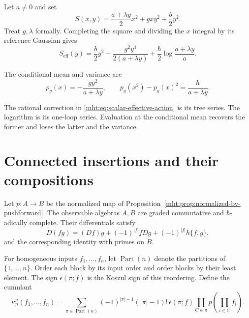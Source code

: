 \begin{example}\label{mht:ex:scalar-effective-action}
Let $a\ne0$ and set
\[
 S(x,y)=\frac{a+\lambda y}{2}x^2+gxy^2+\frac b2y^2.
\]
Treat $g,\lambda$ formally. Completing the square and dividing the
$x$ integral by its reference Gaussian gives
\begin{equation}\label{mht:eq:scalar-effective-action}
 S_{\mathrm{eff}}(y)=\frac b2y^2
       -\frac{g^2y^4}{2(a+\lambda y)}
       +\frac\hbar2\log\frac{a+\lambda y}{a}.
\end{equation}

The conditional mean and variance are
\[
 p_y(x)=-\frac{gy^2}{a+\lambda y},\qquad
 p_y(x^2)-p_y(x)^2=\frac\hbar{a+\lambda y}.
\]

The rational correction in \eqref{mht:eq:scalar-effective-action}
is its tree series. The logarithm is its one-loop series. Evaluation
at the conditional mean recovers the former and loses the latter
and the variance.
\end{example}

\section{Connected insertions and their compositions}

Let $p:A\to B$ be the normalized map of
Proposition~\ref{mht:prop:normalized-bv-pushforward}. The observable
algebras $A,B$ are graded commutative and $\hbar$-adically complete.
Their differentials satisfy
\begin{equation}\label{mht:eq:observable-product-identity}
 D(fg)=(Df)g+(-1)^{|f|}fDg+(-1)^{|f|}\hbar\{f,g\},
\end{equation}
and the corresponding identity with primes on $B$.

For homogeneous inputs $f_1,\ldots,f_n$, let
$\operatorname{Part}(n)$ denote the partitions of $\{1,\ldots,n\}$.
Order each block by its input order and order blocks by their least
element. The sign $\epsilon(\pi;f)$ is the Koszul sign of this
reordering. Define the cumulant
\begin{equation}\label{mht:eq:quantum-cumulants}
 \kappa_n^p(f_1,\ldots,f_n)
  =\sum_{\pi\in\operatorname{Part}(n)}
     (-1)^{|\pi|-1}(|\pi|-1)!\,\epsilon(\pi;f)
       \prod_{C\in\pi}p\left(\prod_{i\in C}f_i\right).
\end{equation}

